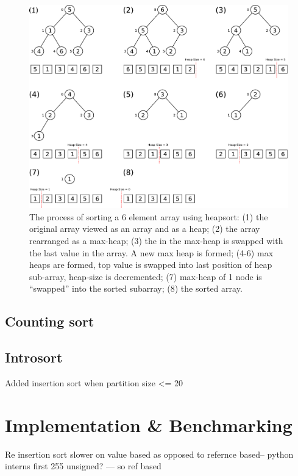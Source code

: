 \documentclass[12pt, a4paper]{article}
\begin{document}
\begin{figure}[h]
    \centering
    \includegraphics[width=15cm]{heap_sort2.pdf}
    \caption{\label{fig:heapsort}The process of sorting a 6 element array using heapsort: (1) the original array viewed as an array and as a heap; (2) the array rearranged as a max-heap; (3) the in the max-heap is swapped with the last value in the array. A new max heap is formed; (4-6) max heaps are formed, top value is swapped into last position of heap sub-array, heap-size is decremented; (7) max-heap of 1 node is   ``swapped'' into the sorted subarray; (8) the sorted array.}
\end{figure}

\subsection{Counting sort}


\subsection{Introsort}\label{sec:introsort}

Added insertion sort when partition size <= 20 


\section{Implementation \& Benchmarking}

Re insertion sort slower on value based as opposed to refernce based-- python interns first 255 unsigned? --- so ref based
\end{document}
